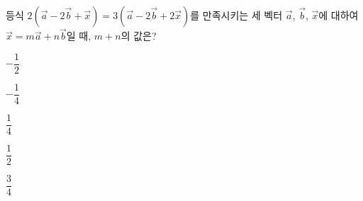 등식 $2(\vec{a}-2\vec{b}+\vec{x})=3(\vec{a}-2\vec{b}+2\vec{x})$를 만족시키는 세 벡터 $\vec{a}$, $\vec{b}$, $\vec{x}$에 대하여 $\vec{x}=m\vec{a}+n\vec{b}$일 때, $m+n$의 값은? 
\begin{choices32}{\rule[-3ex]{0pt}{8ex}$-\dfrac{1}{2}$}{\rule[-3ex]{0pt}{8ex}$-\dfrac{1}{4}$}{\rule[-3ex]{0pt}{8ex}$\dfrac{1}{4}$}{\rule[-3ex]{0pt}{8ex}$\dfrac{1}{2}$}{\rule[-3ex]{0pt}{8ex}$\dfrac{3}{4}$}\end{choices32}
